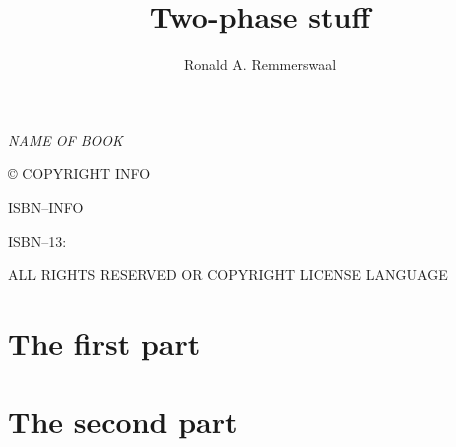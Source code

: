 \documentclass[10pt,twoside,openright]{memoir}
\author{Ronald A. Remmerswaal}
\title{Two-phase stuff}
\date{}
\makeatletter
\def\maketitle{%
  \null
  \thispagestyle{empty}%
  \vfill
  \begin{center}\leavevmode
    \normalfont
    {\LARGE\raggedleft \@author\par}%
    \hrulefill\par
    {\huge\raggedright \@title\par}%
    \vskip 1cm
  \end{center}%
  \vfill
  \null
  \cleardoublepage
  }
\makeatother
\begin{document}
  \let\cleardoublepage\clearpage

  \maketitle

  \frontmatter
  {
    \tableofcontents
  }

  \null\vfill

  \begin{flushleft}
  \textit{NAME OF BOOK}


  © COPYRIGHT INFO


  ISBN--INFO

  ISBN--13:
  \bigskip





  ALL RIGHTS RESERVED OR COPYRIGHT LICENSE LANGUAGE




  \end{flushleft}
  \let\cleardoublepage\clearpage

  \mainmatter
  
  
  \part{The first part}
  
  
  
  \part{The second part}
  

  \backmatter
\end{document}
